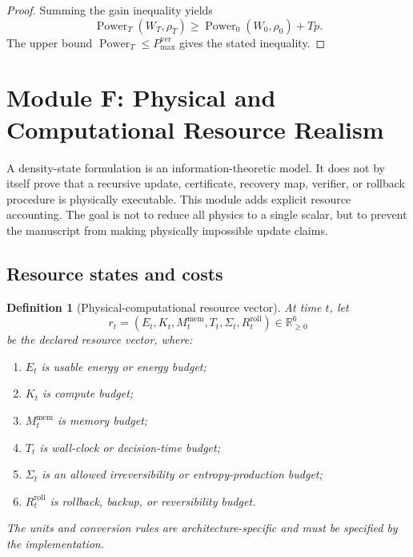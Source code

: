 \documentclass[11pt]{article}
\newtheorem{definition}[theorem]{Definition}
\newcommand{\1}{\mathbf{1}}
\providecommand{\ver}{\mathrm{ver}}
\providecommand{\Power}{\operatorname{Power}}
\begin{document}
\begin{proof}
Summing the gain inequality yields
\[
\Power_T(W_T,\rho_T)
\ge
\Power_0(W_0,\rho_0)+Tp.
\]
The upper bound \(\Power_T\le P_{\max}^{\ver}\) gives the stated inequality.
\end{proof}

\section{Module F: Physical and Computational Resource Realism}
\label{sec:physical_resource_realism}

A density-state formulation is an information-theoretic model.  It does not by itself prove that a recursive update, certificate, recovery map, verifier, or rollback procedure is physically executable.  This module adds explicit resource accounting.  The goal is not to reduce all physics to a single scalar, but to prevent the manuscript from making physically impossible update claims.

\subsection{Resource states and costs}

\begin{definition}[Physical-computational resource vector]
\label{def:physical_computational_resource_vector}
At time \(t\), let
\[
r_t
=
(E_t,K_t,M^{\mathrm{mem}}_t,T_t,\Sigma_t,R^{\mathrm{roll}}_t)
\in\mathbb R_{\ge0}^{6}
\]
be the declared resource vector, where:
\begin{enumerate}[label=(\alph*)]
    \item \(E_t\) is usable energy or energy budget;
    \item \(K_t\) is compute budget;
    \item \(M^{\mathrm{mem}}_t\) is memory budget;
    \item \(T_t\) is wall-clock or decision-time budget;
    \item \(\Sigma_t\) is an allowed irreversibility or entropy-production budget;
    \item \(R^{\mathrm{roll}}_t\) is rollback, backup, or reversibility budget.
\end{enumerate}
The units and conversion rules are architecture-specific and must be specified by the implementation.
\end{definition}
\end{document}
